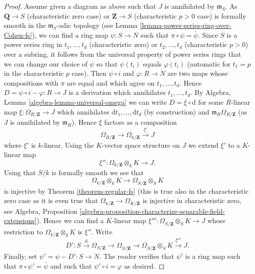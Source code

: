 \documentclass[10pt,a4paper]{amsart}
\theoremstyle{plain}
\theoremstyle{definition}
\theoremstyle{remark}
\numberwithin{equation}{subsection}
\begin{document}
\begin{proof}
\medskip\noindent
Assume given a diagram as above such that $J$ is annihilated by
$\mathfrak m_S$. As $\mathbf{Q} \to S$ (characteristic zero case)
or $\mathbf{Z} \to S$ (characteristic $p > 0$ case)
is formally smooth in the $\mathfrak m_S$-adic topology (see
Lemma \ref{lemma-power-series-ring-over-Cohen-fs}), we can find
a ring map $\psi : S \to N$ such that $\pi \circ \psi = \bar \psi$.
Since $S$ is a power series ring in $t_1, \ldots, t_d$ (characteristic zero)
or $t_2, \ldots, t_d$ (characteristic $p > 0$) over
a subring, it follows from the universal property of power series rings
that we can change our choice of $\psi$ so that $\psi(t_i)$ equals
$\varphi(t_i)$ (automatic for $t_1 = p$ in the characteristic $p$ case).
Then $\psi \circ i$ and $\varphi : R \to N$ are two maps whose
compositions with $\pi$ are equal and which agree on $t_1, \ldots, t_d$.
Hence $D = \psi \circ i - \varphi : R \to J$ is a derivation which
annihilates $t_1, \ldots, t_d$.
By Algebra, Lemma \ref{algebra-lemma-universal-omega} we can write
$D = \xi \circ \text{d}$ for some $R$-linear map
$\xi : \Omega_{R/\mathbf{Z}} \to J$ which annihilates
$\text{d}t_1, \ldots, \text{d}t_d$ (by construction) and
$\mathfrak m_R \Omega_{R/\mathbf{Z}}$ (as $J$ is annihilated by
$\mathfrak m_R$). Hence $\xi$ factors as a composition
$$
\Omega_{R/\mathbf{Z}} \to \Omega_{k/\mathbf{Z}} \xrightarrow{\xi'} J
$$
where $\xi'$ is $k$-linear. Using the $K$-vector space structure on $J$ we
extend $\xi'$ to a $K$-linear map
$$
\xi'' : \Omega_{k/\mathbf{Z}} \otimes_k K \longrightarrow J.
$$
Using that $\overline{S}/k$ is formally smooth we see that
$$
\Omega_{k/\mathbf{Z}} \otimes_k K \to
\Omega_{\overline{S}/\mathbf{Z}} \otimes_S K
$$
is injective by Theorem \ref{theorem-regular-fs} (this is true also
in the characteristic zero case as it is even true that
$\Omega_{k/\mathbf{Z}} \to \Omega_{K/\mathbf{Z}}$ is injective
in characteristic zero, see Algebra,
Proposition \ref{algebra-proposition-characterize-separable-field-extensions}).
Hence we can find a $K$-linear map
$\xi''' : \Omega_{\overline{S}/\mathbf{Z}} \otimes_S K \to J$ whose
restriction to $\Omega_{k/\mathbf{Z}} \otimes_k K$ is $\xi''$. Write
$$
D' : S \xrightarrow{\text{d}} \Omega_{S/\mathbf{Z}}
\to \Omega_{\overline{S}/\mathbf{Z}} \to
\Omega_{\overline{S}/\mathbf{Z}} \otimes_S K \xrightarrow{\xi'''} J.
$$
Finally, set $\psi' = \psi - D' : S \to N$. The reader verifies that $\psi'$
is a ring map such that $\pi \circ \psi' = \bar \psi$ and such that
$\psi' \circ i = \varphi$ as desired.
\end{proof}
\end{document}
